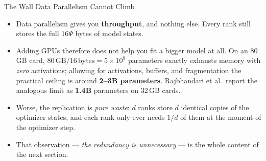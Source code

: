 \begin{frame}{The Wall Data Parallelism Cannot Climb}
  \begin{itemize}\itemsep0.5em
    \item[\textcolor{red}{$\blacktriangleright$}] Data parallelism gives you \textbf{throughput}, and nothing else. Every rank still stores the full $16\Psi$ bytes of model states.
    \item[\textcolor{red}{$\blacktriangleright$}] Adding GPUs therefore does not help you fit a bigger model at all. On an 80\,GB card, $80\,\text{GB} / 16\,\text{bytes} = 5\times10^{9}$ parameters exactly exhausts memory with \emph{zero} activations; allowing for activations, buffers, and fragmentation the practical ceiling is around \textbf{2--3B parameters}. Rajbhandari et al.\ report the analogous limit as \textbf{1.4B} parameters on 32\,GB cards.
    \item[\textcolor{red}{$\blacktriangleright$}] Worse, the replication is \emph{pure waste}: $d$ ranks store $d$ identical copies of the optimizer states, and each rank only ever needs $1/d$ of them at the moment of the optimizer step.
    \item[\textcolor{red}{$\blacktriangleright$}] That observation --- \emph{the redundancy is unnecessary} --- is the whole content of the next section.
  \end{itemize}
\end{frame}
